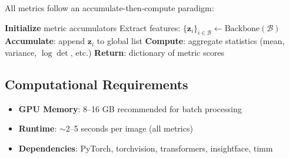 \documentclass[runningheads]{llncs}
\newcommand{\bvec}[1]{\bm{#1}}
\newcommand{\logdet}{\log\det}
\begin{document}
All metrics follow an accumulate-then-compute paradigm:

\begin{algorithm}[h!]
\caption{Metric Computation Pipeline}
\begin{algorithmic}[1]
\STATE \textbf{Initialize} metric accumulators
    \STATE Extract features: $\{\bvec{z}_i\}_{i \in \mathcal{B}} \leftarrow \text{Backbone}(\mathcal{B})$
    \STATE \textbf{Accumulate}: append $\bvec{z}_i$ to global list
\ENDFOR
\STATE \textbf{Compute}: aggregate statistics (mean, variance, $\logdet$, etc.)
\STATE \textbf{Return}: dictionary of metric scores
\end{algorithmic}
\end{algorithm}

\subsection{Computational Requirements}

\begin{itemize}
    \item \textbf{GPU Memory}: 8--16 GB recommended for batch processing
    \item \textbf{Runtime}: $\sim$2--5 seconds per image (all metrics)
    \item \textbf{Dependencies}: PyTorch, torchvision, transformers, insightface, timm
\end{itemize}
\end{document}
